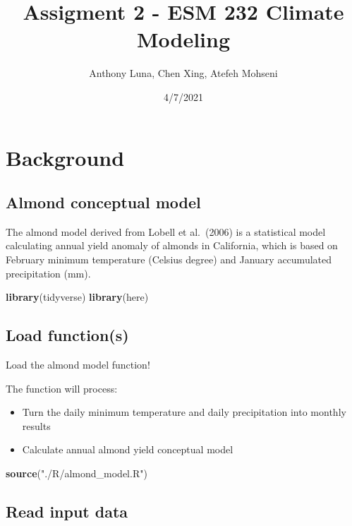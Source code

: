 \documentclass[
]{article}
\title{Assigment 2 - ESM 232 Climate Modeling}
\author{Anthony Luna, Chen Xing, Atefeh Mohseni}
\date{4/7/2021}
\newenvironment{Shaded}{\begin{snugshade}}{\end{snugshade}}
\newcommand{\KeywordTok}[1]{\textcolor[rgb]{0.13,0.29,0.53}{\textbf{#1}}}
\newcommand{\NormalTok}[1]{#1}
\newcommand{\StringTok}[1]{\textcolor[rgb]{0.31,0.60,0.02}{#1}}
\providecommand{\tightlist}{%
  \setlength{\itemsep}{0pt}\setlength{\parskip}{0pt}}
\begin{document}
\maketitle

\hypertarget{background}{%
\section{Background}\label{background}}

\hypertarget{almond-conceptual-model}{%
\subsection{Almond conceptual model}\label{almond-conceptual-model}}

The almond model derived from Lobell et al.~(2006) is a statistical
model calculating annual yield anomaly of almonds in California, which
is based on February minimum temperature (Celsius degree) and January
accumulated precipitation (mm).

\begin{Shaded}
\begin{Highlighting}[]
\KeywordTok{library}\NormalTok{(tidyverse)}
\KeywordTok{library}\NormalTok{(here)}
\end{Highlighting}
\end{Shaded}

\hypertarget{load-functions}{%
\subsection{Load function(s)}\label{load-functions}}

Load the almond model function!

The function will process:

\begin{itemize}
\tightlist
\item
  Turn the daily minimum temperature and daily precipitation into
  monthly results
\item
  Calculate annual almond yield conceptual model
\end{itemize}

\begin{Shaded}
\begin{Highlighting}[]
\KeywordTok{source}\NormalTok{(}\StringTok{"./R/almond_model.R"}\NormalTok{)}
\end{Highlighting}
\end{Shaded}

\hypertarget{read-input-data}{%
\subsection{Read input data}\label{read-input-data}}
\end{document}
